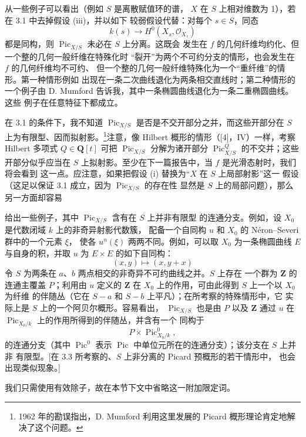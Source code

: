  从一些例子可以看出（例如 $S$ 是离散赋值环的谱，
$X$ 在 $S$ 上相对维数为 1），若在 3.1 中去掉假设 (iii)，并以如下
较弱假设代替：对每个 $s\in S$，同态
\[
k(s)\longrightarrow H^0(X_s,\mathcal O_{X_s})
\]
都是同构，则 $\operatorname{Pic}_{X/S}$ 未必在 $S$ 上分离。这既会
发生在 $f$ 的几何纤维均约化、但一个整的几何一般纤维在特殊化时
“裂开”为两个不可约分支的情形，也会发生在 $f$ 的几何纤维均不可约、
但一个整的几何一般纤维特殊化为一个“重纤维”的情形。第一种情形例如
出现在一条二次曲线退化为两条相交直线时；第二种情形的一个例子由
D. Mumford 告诉我，其中一条椭圆曲线退化为一条二重椭圆曲线。这些
例子在任意特征下都成立。

 在 3.1 的条件下，我不知道
$\operatorname{Pic}_{X/S}$ 是否是不交开部分之并，而这些开部分在 $S$
上为有限型、因而拟射影。\footnote{1962 年的勘误指出，D. Mumford
利用这里发展的 Picard 概形理论肯定地解决了这个问题。}注意，像
Hilbert 概形的情形（[4]，IV）一样，考察 Hilbert 多项式
$Q\in\mathbf Q[t]$ 可把 $\operatorname{Pic}_{X/S}$ 分解为诸开部分
$\operatorname{Pic}^{Q}_{X/S}$ 的不交并；这些开部分似乎应当在 $S$
上拟射影。至少在下一篇报告中，当 $f$ 是光滑态射时，我们将会看到
这一点。应注意，如果把假设 (i) 替换为“$X$ 在 $S$ 上局部射影”这一
假设（这足以保证 3.1 成立，因为 $\operatorname{Pic}_{X/S}$ 的存在性
显然是 $S$ 上的局部问题），那么另一方面却容易

给出一些例子，其中 $\operatorname{Pic}_{X/S}$ 含有在 $S$ 上并非有限型
的连通分支。例如，设 $X_0$ 是代数闭域 $k$ 上的非奇异射影代数簇，
配备一个自同构 $u$ 和 $X_0$ 的 Néron--Severi 群中的一个元素 $\xi$，
使各 $u^n(\xi)$ 两两不同。例如，可以取 $X_0$ 为一条椭圆曲线 $E$
与自身的积，并取 $u$ 为 $E\times E$ 的如下自同构：
\[
(x,y)\longmapsto(x,y+x)
\]
令 $S$ 为两条在 $a$、$b$ 两点相交的非奇异不可约曲线之并。$S$ 上存在
一个群为 $\mathbf Z$ 的连通主覆盖 $P$；利用由 $u$ 定义的
$\mathbf Z$ 在 $X_0$ 上的作用，可由此得到 $S$ 上一个以 $X_0$ 为纤维
的伴随丛（它在 $S-a$ 和 $S-b$ 上平凡）；在所考察的特殊情形中，它
实际上是 $S$ 上的一个阿贝尔概形。容易看出，
$\operatorname{Pic}_{X/S}$ 也是由 $P$ 以及 $\mathbf Z$ 通过 $u$ 在
$\operatorname{Pic}_{X_0/k}$ 上的作用所得到的伴随丛，并含有一个
同构于
\[
P\times\operatorname{Pic}^{0}_{X_0/k},
\]
的连通分支（其中 $\operatorname{Pic}^{0}$ 表示
$\operatorname{Pic}$ 中单位元所在的连通分支）；该分支在 $S$ 上并非
有限型。[在 3.3 所考察的、$S$ 上非分离的 Picard 预概形的若干情形中，
也会出现类似现象。]


我们只需使用有效除子，故在本节下文中省略这一附加限定词。

